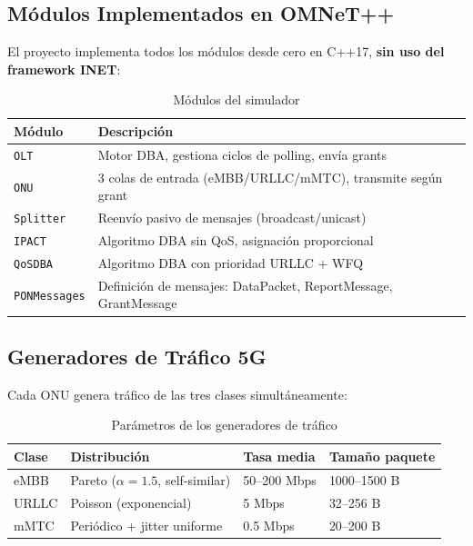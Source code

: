 \documentclass[12pt, letterpaper]{article}
\begin{document}
\subsection{Módulos Implementados en OMNeT++}

El proyecto implementa todos los módulos desde cero en C++17, \textbf{sin uso del framework INET}:

\begin{table}[H]
\centering
\caption{Módulos del simulador}
\begin{tabular}{lp{9cm}}
\toprule
\textbf{Módulo} & \textbf{Descripción} \\
\midrule
\texttt{OLT} & Motor DBA, gestiona ciclos de polling, envía grants \\
\texttt{ONU} & 3 colas de entrada (eMBB/URLLC/mMTC), transmite según grant \\
\texttt{Splitter} & Reenvío pasivo de mensajes (broadcast/unicast) \\
\texttt{IPACT} & Algoritmo DBA sin QoS, asignación proporcional \\
\texttt{QoSDBA} & Algoritmo DBA con prioridad URLLC + WFQ \\
\texttt{PONMessages} & Definición de mensajes: DataPacket, ReportMessage, GrantMessage \\
\bottomrule
\end{tabular}
\end{table}

\subsection{Generadores de Tráfico 5G}

Cada ONU genera tráfico de las tres clases simultáneamente:

\begin{table}[H]
\centering
\caption{Parámetros de los generadores de tráfico}
\begin{tabular}{llll}
\toprule
\textbf{Clase} & \textbf{Distribución} & \textbf{Tasa media} & \textbf{Tamaño paquete} \\
\midrule
eMBB   & Pareto ($\alpha=1.5$, self-similar) & 50–200 Mbps & 1000–1500 B \\
URLLC  & Poisson (exponencial)              & 5 Mbps      & 32–256 B \\
mMTC   & Periódico + jitter uniforme        & 0.5 Mbps    & 20–200 B \\
\bottomrule
\end{tabular}
\end{table}
\end{document}
